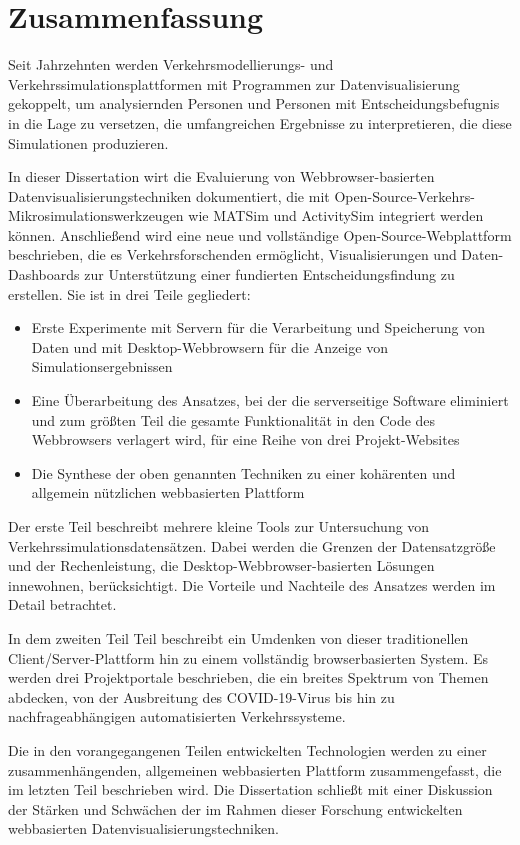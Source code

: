 \chapter*{Zusammenfassung}

Seit Jahrzehnten werden Verkehrsmodellierungs- und Verkehrssimulationsplattformen mit Programmen zur Datenvisualisierung gekoppelt, um analysiernden Personen und Personen mit Entscheidungsbefugnis in die Lage zu versetzen, die umfangreichen Ergebnisse zu interpretieren, die diese Simulationen produzieren.

In dieser Dissertation wirt die Evaluierung von Webbrowser-basierten Datenvisualisierungstechniken dokumentiert, die mit Open-Source-Verkehrs-Mikrosimulationswerkzeugen wie MATSim und ActivitySim integriert werden können. Anschließend wird eine neue und vollständige Open-Source-Webplattform beschrieben, die es Verkehrsforschenden ermöglicht, Visualisierungen und Daten-Dashboards zur Unterstützung einer fundierten Entscheidungsfindung zu erstellen. Sie ist in drei Teile gegliedert:

\begin{itemize}
	\item Erste Experimente mit Servern für die Verarbeitung und Speicherung von Daten und mit Desktop-Webbrowsern für die Anzeige von Simulationsergebnissen
	\item Eine Überarbeitung des Ansatzes, bei der die serverseitige Software eliminiert und zum größten Teil die gesamte Funktionalität in den Code des Webbrowsers verlagert wird, für eine Reihe von drei Projekt-Websites
	\item Die Synthese der oben genannten Techniken zu einer kohärenten und allgemein nützlichen webbasierten Plattform
\end{itemize}

Der erste Teil beschreibt mehrere kleine Tools zur Untersuchung von Verkehrssimulationsdatensätzen. Dabei werden die Grenzen der Datensatzgröße und der Rechenleistung, die Desktop-Webbrowser-basierten Lösungen innewohnen, berücksichtigt. Die Vorteile und Nachteile des Ansatzes werden im Detail betrachtet.

In dem zweiten Teil Teil beschreibt ein Umdenken von dieser traditionellen Client/Server-Plattform hin zu einem vollständig browserbasierten System. Es werden drei Projektportale beschrieben, die ein breites Spektrum von Themen abdecken, von der Ausbreitung des COVID-19-Virus bis hin zu nachfrageabhängigen automatisierten Verkehrssysteme.

Die in den vorangegangenen Teilen entwickelten Technologien werden zu einer zusammenhängenden, allgemeinen webbasierten Plattform zusammengefasst, die im letzten Teil beschrieben wird. Die Dissertation schließt mit einer Diskussion der Stärken und Schwächen der im Rahmen dieser Forschung entwickelten webbasierten Datenvisualisierungstechniken.
